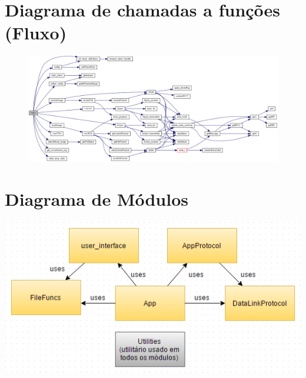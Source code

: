\documentclass[11pt,a4paper,reqno]{report}
\numberwithin{equation}{section}
\begin{document}
\begin{appendices}
\chapter{Diagrama de chamadas a funções (Fluxo)}
\label{flux}
\begin{figure}
\centering
\includegraphics[width=26cm]{_app_8c_a3c04138a5bfe5d72780bb7e82a18e627_cgraph.png}
\end{figure}


\chapter{Diagrama de Módulos}
\label{modulediagram}
\centering
\includegraphics[width=15cm]{rcom_module_diagram.png}

\end{appendices}
\end{document}

